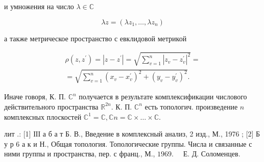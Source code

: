 \documentclass[10pt]{article}
\begin{document}
и умножения на число $\lambda \in \mathbb{C}$



\[

\lambda z=\left(\lambda z_{1}, \ldots, \lambda z_{n}\right)

\]



а также метрическое пространство с евклидовой метрикой



\[

\begin{gathered}

\rho\left(z, z^{\prime}\right)=\left|z-z^{\prime}\right|=\sqrt{\sum_{v=1}^{n}\left|z_{v}-z_{v}^{\prime}\right|^{2}}= \\

=\sqrt{\sum_{v=1}^{n}\left(x_{v}-x_{v}^{\prime}\right)^{2}+\left(y_{v}-y_{v}^{\prime}\right)^{2}} .

\end{gathered}

\]



Иначе говоря, К. П. $\mathbb{C}^{n}$ получается в результате комплексификации числового действительного пространства $\mathbb{R}^{2 n}$. К. П. $\mathbb{C}^{n}$ есть топологич. произведение $n$ комплексных плоскостей $\mathbb{C}^{1}=\mathbb{C}, \mathbb{C} n=\mathbb{C} \times \ldots \times \mathbb{C}$.



лит .: [1] ІІІ а б а т Б. В., Введение в комплексный анализ, 2 изд., М., 1976 ; [2] Б у р 6 а к и Н., Общая топология. Топологические группы. Числа и связанные с ними группы и пространства, пер. с франц., М., $1969 . \quad$ Е. Д. Соломенцев.
\end{document}
